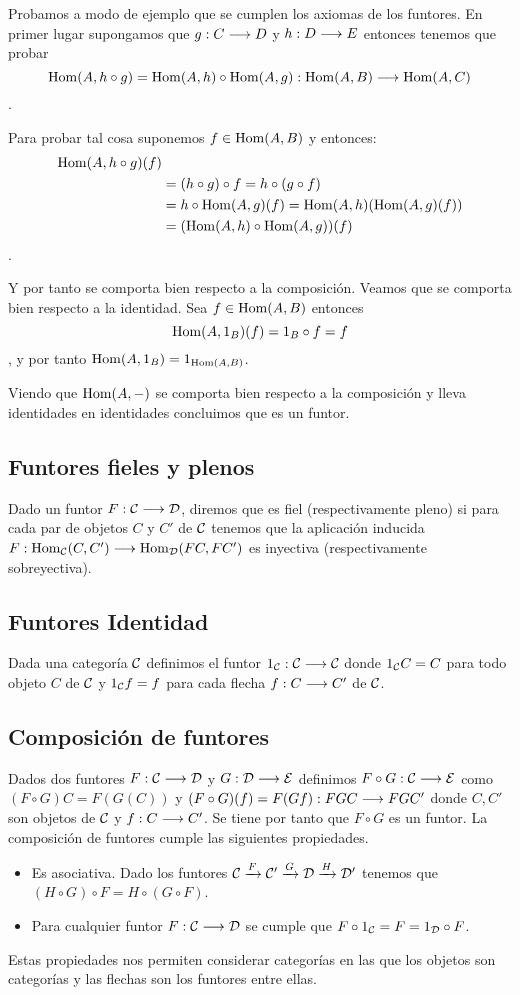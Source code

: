 Probamos a modo de ejemplo
que se cumplen los axiomas de los funtores. En primer lugar
supongamos que $g : C\longrightarrow D$ y $h : D\longrightarrow E$ entonces tenemos
que probar
$$\operatorname{Hom}(A, h \circ g) = \operatorname{Hom}(A, h) \circ \operatorname{Hom}(A, g) :
\operatorname{Hom}(A, B)\longrightarrow \operatorname{Hom}(A, C)$$.

Para probar tal cosa suponemos $f \in \operatorname{Hom}(A, B)$ y entonces:
\begin{align*}
  \operatorname{Hom}(A, h\circ g)(f) & \\
  & = (h \circ g) \circ f = h \circ (g \circ f) \\
  & = h \circ \operatorname{Hom}(A, g)(f) = \operatorname{Hom}(A, h)(\operatorname{Hom}(A, g)(f)) \\
  & = (\operatorname{Hom}(A, h) \circ \operatorname{Hom}(A, g))(f)
\end{align*}.

Y por tanto se comporta bien respecto a la composición. Veamos que se
comporta bien respecto a la identidad. Sea $f \in \operatorname{Hom}(A, B)$ entonces
$$\operatorname{Hom}(A, 1_B)(f) = 1_B \circ f = f$$, y por tanto
$\operatorname{Hom}(A, 1_B) = 1_{\operatorname{Hom}(A, B)}$.

Viendo que $\operatorname{Hom}(A, -)$ se comporta bien respecto a la
composición y lleva identidades en identidades concluimos que es
un funtor.

\subsection{Funtores fieles y plenos}
Dado un funtor $F : \mathcal{C}\longrightarrow \mathcal{D}$,
diremos que es fiel (respectivamente pleno) si para cada par de objetos
$C$ y $C'$ de $\mathcal{C}$ tenemos que la aplicación inducida
$F : \operatorname{Hom}_{\mathcal{C}}(C, C')\longrightarrow \operatorname{Hom}_{\mathcal{D}}(FC, FC')$ es inyectiva
(respectivamente sobreyectiva).

\subsection{Funtores Identidad}
Dada una categoría $\mathcal{C}$ definimos el funtor
$1_{\mathcal{C}} : \mathcal{C}\longrightarrow \mathcal{C}$ donde $1_{\mathcal{C}} C = C$ para todo
objeto $C$ de $\mathcal{C}$ y $1_{\mathcal{C}} f = f$ para cada flecha
$f: C\longrightarrow C'$ de $\mathcal{C}$.

\subsection{Composición de funtores}
Dados dos funtores $F : \mathcal{C}\longrightarrow \mathcal{D}$ y $G: \mathcal{D}\longrightarrow \mathcal{E}$
definimos $F \circ G : \mathcal{C}\longrightarrow \mathcal{E}$ como $(F\circ G)C = F(G(C))$
y $(F\circ G)(f) = F(Gf) : FGC\longrightarrow FGC'$ donde $C, C'$ son objetos
de $\mathcal{C}$ y $f: C\longrightarrow C'$. Se tiene por tanto que $F\circ G$
es un funtor. La composición de funtores cumple las siguientes
propiedades.
\begin{itemize}
\item Es asociativa. Dado los funtores
  $\mathcal{C} \xrightarrow{F} \mathcal{C}' \xrightarrow{G} \mathcal{D} \xrightarrow{H} \mathcal{D}'$
  tenemos que $(H \circ G) \circ F = H \circ (G \circ F)$.
\item Para cualquier funtor $F : \mathcal{C}\longrightarrow \mathcal{D}$ se cumple
  que $F \circ 1_{\mathcal{C}} = F = 1_{\mathcal{D}} \circ F$.
\end{itemize}
Estas propiedades nos permiten considerar categorías en las que
los objetos son categorías y las flechas son los funtores entre
ellas.

